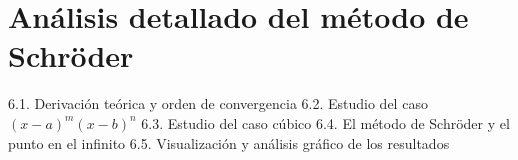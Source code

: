 \documentclass[12pt,a4paper,spanish]{book}
\theoremstyle{plain}
\theoremstyle{definition}
\theoremstyle{remark}
\begin{document}
%
%
%
%
%



\chapter{Análisis detallado del método de Schröder}


6.1. Derivación teórica y orden de convergencia
6.2. Estudio del caso $(x - a)^m (x - b)^n$
6.3. Estudio del caso cúbico
6.4. El método de Schröder y el punto en el infinito
6.5. Visualización y análisis gráfico de los resultados
\end{document}
